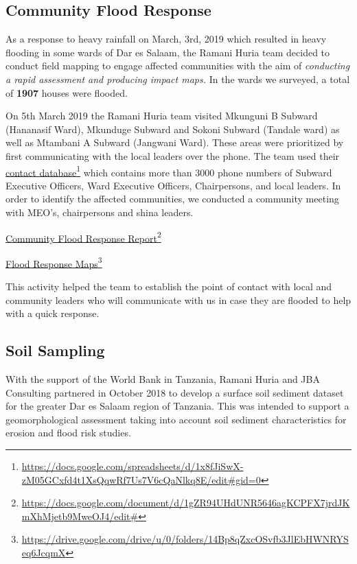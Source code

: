 \documentclass[a4paper,12pt,twoside]{article}
\begin{document}
\begin{multicols}{2}
\subsection{Community Flood Response}
As a response to heavy rainfall on March, 3rd, 2019 which resulted in heavy flooding in some wards of Dar es Salaam, the Ramani Huria team decided to conduct field mapping to engage affected communities with the aim of \textit{conducting a rapid assessment and producing impact maps.} In the wards we surveyed, a total of \textbf{1907} houses were flooded.

On 5th March 2019 the Ramani Huria team visited Mkunguni B Subward (Hananasif Ward), Mkunduge Subward and Sokoni Subward (Tandale ward) as well as Mtambani A Subward (Jangwani Ward). These areas were prioritized by first communicating with the local leaders over the phone. The team used their \href{https://docs.google.com/spreadsheets/d/1x8fJiSwX-zM05GCxfd4t1XsQqwRf7Us7V6cQaNlkq8E/edit#gid=0}{contact database}\footnote{\url{https://docs.google.com/spreadsheets/d/1x8fJiSwX-zM05GCxfd4t1XsQqwRf7Us7V6cQaNlkq8E/edit#gid=0}} which contains more than 3000 phone numbers of Subward Executive Officers, Ward Executive Officers, Chairpersons, and local leaders. In order to identify the affected communities, we conducted a community meeting with MEO’s, chairpersons and shina leaders.

\medskip
\href{https://docs.google.com/document/d/1gZR94UHdUNR5646agKCPFX7jrdJKmXhMjetb9MweOJ4/edit#}{Community Flood Response Report}\footnote{\url{https://docs.google.com/document/d/1gZR94UHdUNR5646agKCPFX7jrdJKmXhMjetb9MweOJ4/edit#}}

\medskip
\href{https://drive.google.com/drive/u/0/folders/14Bp8qZxcOSvfb3JlEbHWNRYSeq6JcqmX}{Flood Response Maps}\footnote{\url{https://drive.google.com/drive/u/0/folders/14Bp8qZxcOSvfb3JlEbHWNRYSeq6JcqmX}}

This activity helped the team to establish the point of contact with local and community leaders who will communicate with us in case they are flooded to help with a quick response.


\subsection{Soil Sampling}
With the support of the World Bank in Tanzania, Ramani Huria and JBA Consulting partnered in October 2018 to develop a surface soil sediment dataset for the greater Dar es Salaam region of Tanzania. This was intended to support a geomorphological assessment taking into account soil sediment characteristics for erosion and flood risk studies.



\end{multicols}
\end{document}
